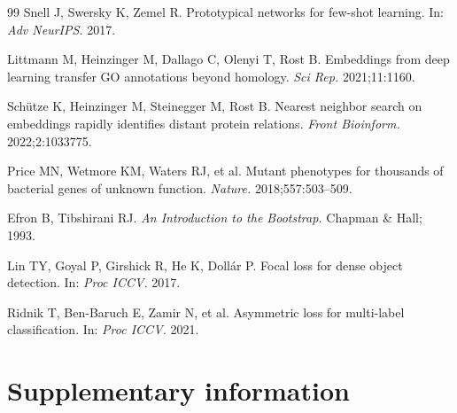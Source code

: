\documentclass[11pt]{article}
\begin{document}
\begin{thebibliography}{99}
Snell J, Swersky K, Zemel R. Prototypical networks for few-shot learning. In: \emph{Adv NeurIPS.} 2017.

Littmann M, Heinzinger M, Dallago C, Olenyi T, Rost B. Embeddings from deep learning transfer GO annotations beyond
homology. \emph{Sci Rep.} 2021;11:1160.

Sch\"utze K, Heinzinger M, Steinegger M, Rost B. Nearest neighbor search on embeddings rapidly identifies distant
protein relations. \emph{Front Bioinform.} 2022;2:1033775.

Price MN, Wetmore KM, Waters RJ, et al. Mutant phenotypes for thousands of bacterial genes of unknown function.
\emph{Nature.} 2018;557:503--509.

Efron B, Tibshirani RJ. \emph{An Introduction to the Bootstrap.} Chapman \& Hall; 1993.

Lin TY, Goyal P, Girshick R, He K, Doll\'ar P. Focal loss for dense object detection. In: \emph{Proc ICCV.} 2017.

Ridnik T, Ben-Baruch E, Zamir N, et al. Asymmetric loss for multi-label classification. In: \emph{Proc ICCV.} 2021.

\end{thebibliography}
\normalsize

\clearpage
\section*{Supplementary information}
\setcounter{table}{0}
\renewcommand{\thetable}{S\arabic{table}}
\end{document}
